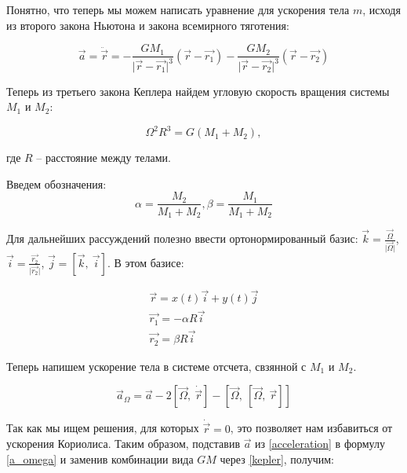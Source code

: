 \documentclass[12pt]{article}
\begin{document}
    Понятно, что теперь мы можем написать уравнение для ускорения тела $m$, 
    исходя из второго закона Ньютона и закона всемирного тяготения:
    
    \begin{equation}
        \vec{a} = \ddot{\vec{r}} = -\frac{GM_1}{\lvert \vec{r} - \vec{r_1} \rvert^3}
        (\vec{r} - \vec{r_1}) - \frac{GM_2}{\lvert \vec{r} - \vec{r_2} \rvert^3}
        (\vec{r} - \vec{r_2}) 
        \label{acceleration}
    \end{equation}

    \par Теперь из третьего закона Кеплера найдем угловую скорость вращения системы
    $M_1$ и $M_2$:

    \begin{equation}
        \Omega^2 R^3 = G(M_1 + M_2), 
        \label{kepler}
    \end{equation}

    где $R$ -- расстояние между телами. 

    \par Введем обозначения:
    $$ \alpha = \frac{M_2}{M_1 + M_2}, \beta = \frac{M_1}{M_1 + M_2} $$

    \par Для дальнейших рассуждений полезно ввести ортонормированный
    базис: $\vec{k} = \frac{\vec{\Omega}}{\lvert \vec{\Omega} \rvert}$, 
    $\vec{i} = \frac{\vec{r_2}}{\lvert \vec{r_2} \rvert}$, $\vec{j} =
    [ \vec{k},\: \vec{i} ]$. В этом базисе:

    \begin{eqnarray*}
        \vec{r}   = x(t)\vec{i} + y(t)\vec{j}\\
        \vec{r_1} = -\alpha R\vec{i}\\
        \vec{r_2} = \beta R\vec{i}
    \end{eqnarray*}

    Теперь напишем ускорение тела в системе отсчета, свзянной с $M_1$ и $M_2$.
    
    \begin{equation}
        \vec{a}_{\Omega} = \vec{a} - 2[\vec{\Omega},\: \dot{\vec{r}}] - 
                            [\vec{\Omega},\: [\vec{\Omega},\: \vec{r}]]
        \label{a_omega}
    \end{equation}

    Так как мы ищем решения, для которых $\dot{\vec{r}} = 0$, это
    позволяет нам избавиться от ускорения Кориолиса. Таким образом, подставив 
    $\vec{a}$ из \ref{acceleration} в формулу \ref{a_omega} и заменив
    комбинации вида $GM$ через \ref{kepler}, получим:
\end{document}
